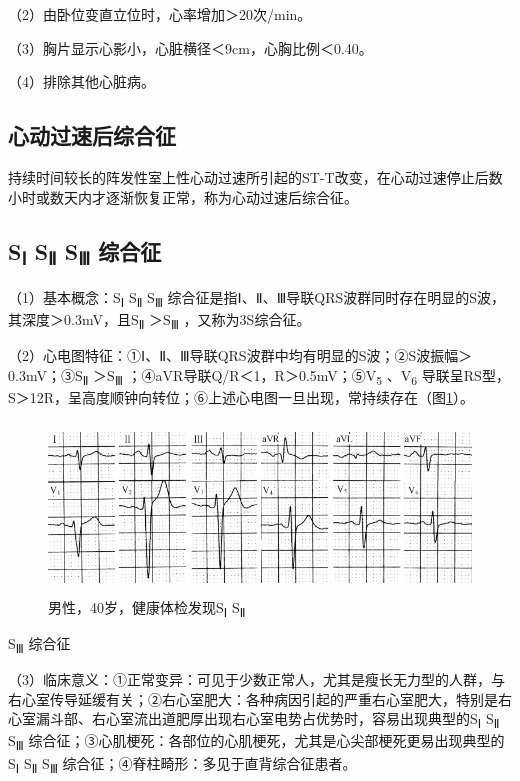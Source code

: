 （2）由卧位变直立位时，心率增加＞20次/min。

（3）胸片显示心影小，心脏横径＜9cm，心胸比例＜0.40。

（4）排除其他心脏病。

\protect\hypertarget{text00047.htmlux5cux23subid566}{}{}

\subsection{心动过速后综合征}

持续时间较长的阵发性室上性心动过速所引起的ST-T改变，在心动过速停止后数小时或数天内才逐渐恢复正常，称为心动过速后综合征。

\protect\hypertarget{text00047.htmlux5cux23subid567}{}{}

\subsection{S\textsubscript{Ⅰ} S\textsubscript{Ⅱ} S\textsubscript{Ⅲ} 综合征}

（1）基本概念：S\textsubscript{Ⅰ} S\textsubscript{Ⅱ} S\textsubscript{Ⅲ}
综合征是指Ⅰ、Ⅱ、Ⅲ导联QRS波群同时存在明显的S波，其深度＞0.3mV，且S\textsubscript{Ⅱ}
＞S\textsubscript{Ⅲ} ，又称为3S综合征。

（2）心电图特征：①Ⅰ、Ⅱ、Ⅲ导联QRS波群中均有明显的S波；②S波振幅＞0.3mV；③S\textsubscript{Ⅱ}
＞S\textsubscript{Ⅲ} ；④aVR导联Q/R＜1，R＞0.5mV；⑤V\textsubscript{5}
、V\textsubscript{6}
导联呈RS型，S＞12R，呈高度顺钟向转位；⑥上述心电图一旦出现，常持续存在（图\ref{fig40-14}）。

\begin{figure}[!htbp]
 \centering
 \includegraphics[width=5.04167in,height=1.79167in]{./images/Image00676.jpg}
 \captionsetup{justification=centering}
 \caption{男性，40岁，健康体检发现S\textsubscript{Ⅰ} S\textsubscript{Ⅱ}}
 \label{fig40-14}
  \end{figure} 
S\textsubscript{Ⅲ} 综合征

（3）临床意义：①正常变异：可见于少数正常人，尤其是瘦长无力型的人群，与右心室传导延缓有关；②右心室肥大：各种病因引起的严重右心室肥大，特别是右心室漏斗部、右心室流出道肥厚出现右心室电势占优势时，容易出现典型的S\textsubscript{Ⅰ}
S\textsubscript{Ⅱ} S\textsubscript{Ⅲ}
综合征；③心肌梗死：各部位的心肌梗死，尤其是心尖部梗死更易出现典型的S\textsubscript{Ⅰ}
S\textsubscript{Ⅱ} S\textsubscript{Ⅲ}
综合征；④脊柱畸形：多见于直背综合征患者。

